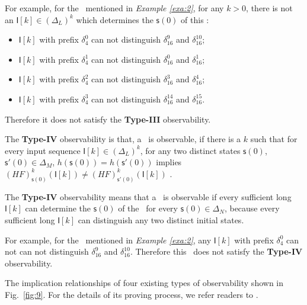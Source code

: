 \begin{example}
For example, for the \BCN\ mentioned in {\em Example \ref{exa:2}}, for any $k>0$, there is not an $\mathsf{I}[k]\in(\Delta_L)^k$ which determines the $\mathsf{s}(0)$ of this \BCN:
\begin{itemize}
  \item $\mathsf{I}[k]$ with prefix $\delta_{4}^0$ can not distinguish $\delta_{16}^9$ and $\delta_{16}^{10}$;
  \item $\mathsf{I}[k]$ with prefix $\delta_{4}^1$ can not distinguish $\delta_{16}^0$ and $\delta_{16}^{1}$;
  \item $\mathsf{I}[k]$ with prefix $\delta_{4}^2$ can not distinguish $\delta_{16}^3$ and $\delta_{16}^{4}$;
  \item $\mathsf{I}[k]$ with prefix $\delta_{4}^3$ can not distinguish $\delta_{16}^{14}$ and $\delta_{16}^{15}$.
\end{itemize} 
Therefore it does not satisfy the {\bf Type-III} observability. 
\label{exa:6}
\end{example}  
\begin{definition}
	The {\bf Type-IV} observability is that, a \BCN\ is observable, if there is a $k$ such that for every input sequence $\mathsf{I}[k]\in(\Delta_L)^{k}$, for any two distinct states $\mathsf{s}(0)$, $\mathsf{s}'(0) \in \Delta_M$, $h(\mathsf{s}(0))=h(\mathsf{s}'(0))$ implies $(HF)^{k}_{\mathsf{s}(0)}(\mathsf{I}[k])\neq (HF)^{k}_{\mathsf{s}'(0)}(\mathsf{I}[k])$ \cite{Fornasini2013Observability}.
\end{definition}

The {\bf Type-IV} observability means that a \BCN\ is observable if every sufficient long $\mathsf{I}[k]$ can determine the $\mathsf{s}(0)$ of the \BCN\ for every $\mathsf{s}(0)\in\Delta_N$, because every sufficient long $\mathsf{I}[k]$ can distinguish any two distinct initial states.%
\begin{example}
For example, for the \BCN\ mentioned in {\em Example \ref{exa:2}}, any $\mathsf{I}[k]$ with prefix $\delta_{4}^0$ can not can not distinguish $\delta_{16}^9$ and $\delta_{16}^{10}$. 
Therefore this \BCN\ does not satisfy the {\bf Type-IV} observability. 
\label{exa:7}
\end{example}  

The implication relationships of four existing types of observability shown in Fig.~\ref{fig:9}. For the details of its proving process, we refer readers to \cite{Zhang2016Observability}.

